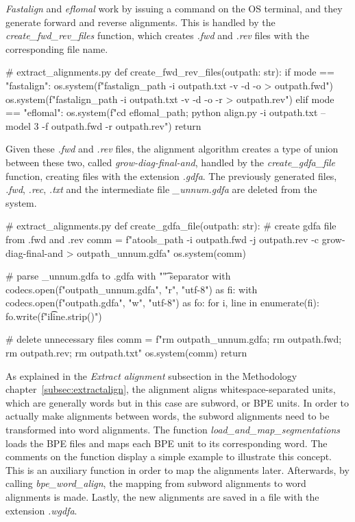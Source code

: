 \emph{Fastalign} and \emph{eflomal} work by issuing a command on the OS terminal, and they generate forward and reverse alignments. This is handled by the \emph{create\_fwd\_rev\_files} function, which creates \emph{.fwd} and \emph{.rev} files with the corresponding file name.

\begin{python}
# extract_alignments.py
def create_fwd_rev_files(outpath: str):
  if mode == "fastalign":
    os.system(f"{fastalign_path} -i {outpath}.txt -v -d -o > {outpath}.fwd")
    os.system(f"{fastalign_path} -i {outpath}.txt -v -d -o -r > {outpath}.rev")
  elif mode == "eflomal":
    os.system(f"cd {eflomal_path}; python align.py -i {outpath}.txt --model 3 -f {outpath}.fwd -r {outpath}.rev")
  return
\end{python}

Given these \emph{.fwd} and \emph{.rev} files, the alignment algorithm creates a type of union between these two, called \emph{grow-diag-final-and}, handled by the \emph{create\_gdfa\_file} function, creating files with the extension \emph{.gdfa}. The previously generated files, \emph{.fwd}, \emph{.rec}, \emph{.txt} and the intermediate file \emph{\_unnum.gdfa} are deleted from the system.

\begin{python}
# extract_alignments.py
def create_gdfa_file(outpath: str):
  # create gdfa file from .fwd and .rev
  comm = f"{atools_path} -i {outpath}.fwd -j {outpath}.rev -c grow-diag-final-and > {outpath}_unnum.gdfa"
  os.system(comm)

  # parse _unnum.gdfa to .gdfa with "\t" separator
  with codecs.open(f"{outpath}_unnum.gdfa", "r", "utf-8") as fi:
    with codecs.open(f"{outpath}.gdfa", "w", "utf-8") as fo:
      for i, line in enumerate(fi):
        fo.write(f"{i}\t{line.strip()}\n")

  # delete unnecessary files
  comm = f"rm {outpath}_unnum.gdfa; rm {outpath}.fwd; rm {outpath}.rev; rm {outpath}.txt"
  os.system(comm)
  return
\end{python}

As explained in the \textit{Extract alignment} subsection in the Methodology chapter~\ref{subsec:extractalign}, the alignment aligns whitespace-separated units, which are generally words but in this case are subword, or BPE units. In order to actually make alignments between words, the subword alignments need to be transformed into word alignments. The function \emph{load\_and\_map\_segmentations} loads the BPE files and maps each BPE unit to its corresponding word. The comments on the function display a simple example to illustrate this concept. This is an auxiliary function in order to map the alignments later. Afterwards, by calling \emph{bpe\_word\_align}, the mapping from subword alignments to word alignments is made. Lastly, the new alignments are saved in a file with the extension \emph{.wgdfa}.


